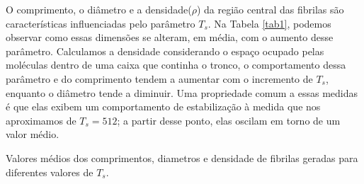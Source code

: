 \documentclass{report}
\begin{document}
        O comprimento, o diâmetro e a densidade(\(\rho\)) da região central das fibrilas são características influenciadas pelo 
        parâmetro \(T_{s}\). Na Tabela \ref{tab1}, podemos observar como essas dimensões se alteram, em média, com o 
        aumento desse parâmetro. Calculamos a densidade considerando o espaço ocupado pelas moléculas dentro de uma caixa
        que continha o tronco, o comportamento dessa parâmetro e do comprimento tendem a aumentar com o incremento de \(T_{s}\), enquanto 
        o diâmetro tende a diminuir. Uma propriedade comum a essas medidas é que elas exibem um comportamento de 
        estabilização à medida que nos aproximamos de \(T_{s} = 512\); a partir desse ponto, elas oscilam em torno de um 
        valor médio. 
    
        \begin{table}[H]
            \caption{Valores médios dos comprimentos, diametros e densidade de fibrilas geradas para diferentes valores de \(T_{s}\).}
    

\end{table}
\end{document}
